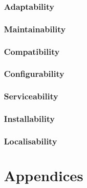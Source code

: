 \documentclass[11pt,a4paper,oneside,svgnames]{report}
\begin{document}
\subsection{Adaptability}

\subsection{Maintainability}

\subsection{Compatibility}

\subsection{Configurability}

\subsection{Serviceability}

\subsection{Installability}

\subsection{Localisability}


\chapter{Appendices}
\printglossaries{}

\listoffigures{}
\listoftables{}
\end{document}
